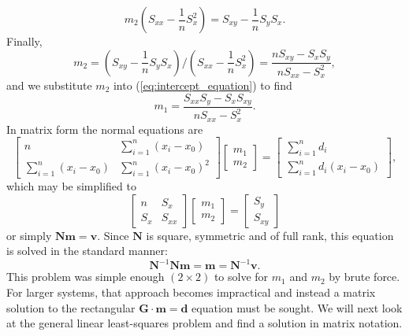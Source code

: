 \begin{equation}
m_2 \left ( S_{xx} - \frac{1}{n} S_x^2 \right ) = S_{xy} - \frac{1}{n} S_y S_x.
\end{equation}	 
Finally,
\begin{equation}
m_2 = \left ( S_{xy} - \frac{1}{n} S_y  S_x \right ) / \left ( S_{xx} - \frac{1}{n} S_x^2 \right )  =\frac{n S_{xy} - S_x  S_y}{n S_{xx} - S_x^2},
\label{eq:slope_solution}
\end{equation}	 
and we substitute $m_2$ into (\ref{eq:intercept_equation}) to find
\begin{equation}
m_1 = \frac{S_{xx} S_y - S_x  S_{xy}}{n S_{xx} - S_x^2}.
\label{eq:intercept_solution}
\end{equation}	 
In matrix form the normal equations are
\begin{equation}
\left [
\begin{array}{cc}
n & \displaystyle \sum^n_{i=1}(x_i - x_0)\\
\displaystyle \sum^n_{i=1}(x_i - x_0) & \displaystyle \sum^n_{i=1}(x_i - x_0)^2
\end{array} \right ]
\left [
\begin{array}{c}
m_1\\ m_2
\end{array} \right ] =
\left[
\begin{array}{c}
\displaystyle \sum^n_{i=1}d_i\\
\displaystyle \sum^n_{i=1}d_i(x_i - x_0)
\end{array}
\right ],
\end{equation}
which may be simplified to
\begin{equation}
\left [
\begin{array}{cc}
n & S_x \\
S_x & S_{xx}
\end{array} \right ]
\left [
\begin{array}{c}
m_1\\ m_2
\end{array} \right ] =
\left[
\begin{array}{c}
S_y\\
S_{xy}
\end{array}
\right ]
\end{equation}
or simply $\mathbf{Nm = v}$. Since $\mathbf{N}$ is square, symmetric and of full rank, this equation is solved in 
the standard manner:
\begin{equation}
\mathbf{N}^{-1} \mathbf{Nm = m = N}^{-1} \mathbf{v}.
\end{equation}	 
This problem was simple enough $(2 \times 2)$ to solve for $m_1$ and $m_2$ by brute force. For larger systems,
that approach becomes impractical and instead a matrix solution to the rectangular $\mathbf{G\cdot m = d}$ equation must be 
sought. We will next look at the general linear least-squares problem and find a solution in 
matrix notation.

